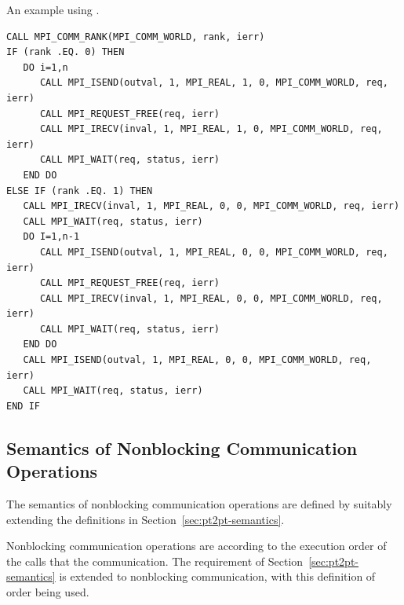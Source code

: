 \begin{example}
\label{pt2pt-exK}
%
%
An example using .

\begin{lstlisting}[language={[MPI]Fortran},basicstyle=\lstsmall]
CALL MPI_COMM_RANK(MPI_COMM_WORLD, rank, ierr)
IF (rank .EQ. 0) THEN
   DO i=1,n
      CALL MPI_ISEND(outval, 1, MPI_REAL, 1, 0, MPI_COMM_WORLD, req, ierr)
      CALL MPI_REQUEST_FREE(req, ierr)
      CALL MPI_IRECV(inval, 1, MPI_REAL, 1, 0, MPI_COMM_WORLD, req, ierr)
      CALL MPI_WAIT(req, status, ierr)
   END DO
ELSE IF (rank .EQ. 1) THEN
   CALL MPI_IRECV(inval, 1, MPI_REAL, 0, 0, MPI_COMM_WORLD, req, ierr)
   CALL MPI_WAIT(req, status, ierr)
   DO I=1,n-1
      CALL MPI_ISEND(outval, 1, MPI_REAL, 0, 0, MPI_COMM_WORLD, req, ierr)
      CALL MPI_REQUEST_FREE(req, ierr)
      CALL MPI_IRECV(inval, 1, MPI_REAL, 0, 0, MPI_COMM_WORLD, req, ierr)
      CALL MPI_WAIT(req, status, ierr)
   END DO
   CALL MPI_ISEND(outval, 1, MPI_REAL, 0, 0, MPI_COMM_WORLD, req, ierr)
   CALL MPI_WAIT(req, status, ierr)
END IF
\end{lstlisting}
\end{example}

\subsection{Semantics of Nonblocking Communication Operations}
\label{subsec:pt2pt-semantics}



The semantics of nonblocking communication operations are defined by suitably extending the
definitions in Section~\ref{sec:pt2pt-semantics}.

Nonblocking communication operations are  according to the execution
order of the calls that  the communication.
The 
requirement of Section~\ref{sec:pt2pt-semantics} is extended to
nonblocking communication, with this definition of order being used.

